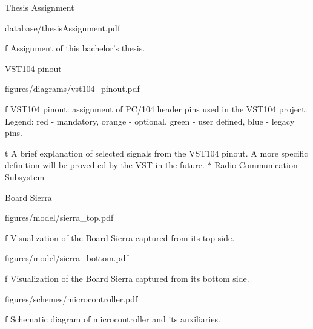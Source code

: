 

\app Thesis Assignment

\midinsert
    \hsize \cinspic database/thesisAssignment.pdf
    \caption/f Assignment of this bachelor's thesis.
\endinsert




\app VST104 pinout

\midinsert
    \hsize \cinspic figures/diagrams/vst104_pinout.pdf
    \caption/f VST104 pinout: assignment of PC/104 header pins used in the VST104 project. Legend: red - mandatory, orange - optional, green - user defined, blue - legacy pins.
\endinsert

\midinsert {}
    \caption/t A brief explanation of selected signals from the VST104 pinout. A more specific definition will be proved ed by the VST in the future. $*$ Radio Communication Subsystem
\endinsert




\app Board Sierra

\midinsert
    \hsize \cinspic figures/model/sierra_top.pdf
    \caption/f Visualization of the Board Sierra captured from its top side.
\endinsert

\midinsert
    \hsize \cinspic figures/model/sierra_bottom.pdf
    \caption/f Visualization of the Board Sierra captured from its bottom side.
\endinsert

\midinsert
    \hsize \cinspic figures/schemes/microcontroller.pdf
    \caption/f Schematic diagram of microcontroller and its auxiliaries.
\endinsert


